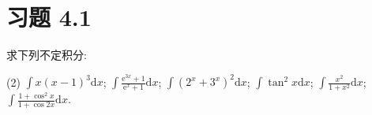 \section{习题 4.1}

\begin{exercise}[4.1.1]
    求下列不定积分:
    \begin{tasks}(2)
        \task $\displaystyle \int x(x - 1)^3 \mathrm{d}x$;
        \task $\displaystyle \int \frac{\mathrm{e}^{3x} + 1}{\mathrm{e}^x + 1} \mathrm{d}x$;
        \task $\displaystyle \int (2^x + 3^x)^2 \mathrm{d}x$;
        \task $\displaystyle \int \tan^2 x \mathrm{d}x$;
        \task $\displaystyle \int \frac{x^2}{1 + x^2} \mathrm{d}x$;
        \task $\displaystyle \int \frac{1 + \cos^2 x}{1 + \cos 2x} \mathrm{d}x$.
    \end{tasks}
\end{exercise}

